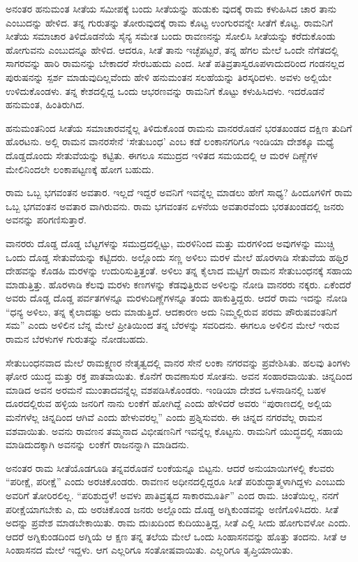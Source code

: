 ಅನಂತರ ಹನುಮಂತ ಸೀತೆಯ ಸಮೀಪಕ್ಕೆ ಬಂದು ಸೀತೆಯನ್ನು ಹುಡುಕು ವುದಕ್ಕೆ ರಾಮ ಕಳುಹಿಸಿದ ಚಾರ ತಾನು ಎಂಬುದನ್ನು ಹೇಳಿದ. ತನ್ನ ಗುರುತನ್ನು ತೋರುವುದಕ್ಕೆ ರಾಮ ಕೊಟ್ಟ ಉಂಗುರವನ್ನೇ ಸೀತೆಗೆ ಕೊಟ್ಟ. ರಾಮನಿಗೆ ಸೀತೆಯ ಸಮಾಚಾರ ತಿಳಿದೊಡನೆಯೆ ಸೈನ್ಯ ಸಮೇತ ಬಂದು ರಾವಣನನ್ನು ಸೋಲಿಸಿ ಸೀತೆಯನ್ನು ಕರೆದುಕೊಂಡು ಹೋಗುವನು ಎಂಬುದನ್ನೂ ಹೇಳಿದ. ಆದರೂ, ಸೀತೆ ತಾನು ಇಚ್ಛೆಪಟ್ಟರೆ, ತನ್ನ ಹೆಗಲ ಮೇಲೆ ಒಂದೇ ನೆಗೆತದಲ್ಲಿ ಸಾಗರವನ್ನು ಹಾರಿ ರಾಮನನ್ನು ಬೇಕಾದರೆ ಸೇರಬಹುದು ಎಂದ. ಸೀತೆ ಪತಿವ್ರತಾಸ್ವರೂಪಳಾದುದರಿಂದ ಗಂಡನಲ್ಲದ ಪುರುಷನನ್ನು ಸ್ಪರ್ಶ ಮಾಡುವುದಿಲ್ಲವೆಂದು ಹೇಳಿ ಹನುಮಂತನ ಸಲಹೆಯನ್ನು ತಿರಸ್ಕರಿದಳು. ಅವಳು ಅಲ್ಲಿಯೇ ಉಳಿದುಕೊಂಡಳು. ತನ್ನ ಕೇಶದಲ್ಲಿದ್ದ ಒಂದು ಆಭರಣವನ್ನು ರಾಮನಿಗೆ ಕೊಟ್ಟು ಕಳುಹಿಸಿದಳು. ಇದರೊಡನೆ ಹನುಮಂತ, ಹಿಂತಿರುಗಿದ.

ಹನುಮಂತನಿಂದ ಸೀತೆಯ ಸಮಾಚಾರವನ್ನೆಲ್ಲ ತಿಳಿದುಕೊಂಡ ರಾಮನು ವಾನರರೊಡನೆ ಭರತಖಂಡದ ದಕ್ಷಿಣ ತುದಿಗೆ ಹೊರಟನು. ಅಲ್ಲಿ ರಾಮನ ವಾನರಸೇನೆ ‘ಸೇತುಬಂಧ’ ಎಂಬ ಕಡೆ ಲಂಕಾನಗರಿಗೂ ಇಂಡಿಯಾ ದೇಶಕ್ಕೂ ಮಧ್ಯೆ ದೊಡ್ಡದೊಂದು ಸೇತುವೆಯನ್ನು ಕಟ್ಟಿತು. ಈಗಲೂ ಸಮುದ್ರದ ಇಳಿತದ ಸಮಯದಲ್ಲಿ ಆ ಮರಳ ದಿಣ್ಣೆಗಳ ಮೇಲಿನಿಂದಲೇ ಲಂಕಾಪಟ್ಟಣಕ್ಕೆ ಹೋಗ ಬಹುದು.

ರಾಮ ಒಬ್ಬ ಭಗವಂತನ ಅವತಾರ. ಇಲ್ಲದೆ ಇದ್ದರೆ ಅವನಿಗೆ ಇವನ್ನೆಲ್ಲ ಮಾಡಲು ಹೇಗೆ ಸಾಧ್ಯ? ಹಿಂದೂಗಳಿಗೆ ರಾಮ ಒಬ್ಬ ಭಗವಂತನ ಅವತಾರ ವಾಗಿರುವನು. ರಾಮ ಭಗವಂತನ ಏಳನೆಯ ಅವತಾರವೆಂದು ಭರತಖಂಡದಲ್ಲಿ ಜನರು ಅವನನ್ನು ಪರಿಗಣಿಸುತ್ತಾರೆ.

ವಾನರರು ದೊಡ್ಡ ದೊಡ್ಡ ಬೆಟ್ಟಗಳನ್ನು ಸಮುದ್ರದಲ್ಲಿಟ್ಟು, ಮರಳಿನಿಂದ ಮತ್ತು ಮರಗಳಿಂದ ಅವುಗಳನ್ನು ಮುಚ್ಚಿ ಒಂದು ದೊಡ್ಡ ಸೇತುವೆಯನ್ನು ಕಟ್ಟಿದರು. ಅಲ್ಲೊಂದು ಸಣ್ಣ ಅಳಿಲು ಮರಳ ಮೇಲೆ ಹೊರಳಾಡಿ ಸೇತುವೆಯ ಹಥ್ತಿರ ದೇಹವನ್ನು ಕೊಡಹಿ ಮರಳನ್ನು ಉದುರಿಸುತ್ತಿತ್ತಂತೆ. ಅಳಿಲು ತನ್ನ ಕೈಲಾದ ಮಟ್ಟಿಗೆ ರಾಮನ ಸೇತುಬಂಧನಕ್ಕೆ ಸಹಾಯ ಮಾಡುತ್ತಿತ್ತು. ಹೊರಳಾಡಿ ಕೆಲವು ಮರಳು ಕಣಗಳನ್ನು ಕೆಡವುತ್ತಿರುವ ಅಳಿಲನ್ನು ನೋಡಿ ವಾನರರು ನಕ್ಕರು. ಏಕೆಂದರೆ ಅವರು ದೊಡ್ಡ ದೊಡ್ಡ ಪರ್ವತಗಳನ್ನೂ ಮರಳುದಿಣ್ಣೆಗಳನ್ನೂ ತಂದು ಹಾಕುತ್ತಿದ್ದರು. ಆದರೆ ರಾಮ ಇದನ್ನು ನೋಡಿ “ಧನ್ಯ ಅಳಿಲು, ತನ್ನ ಕೈಲಾದಷ್ಟು ಅದು ಮಾಡುತ್ತಿದೆ. ಆದಕಾರಣ ಅದು ನಿಮ್ಮಲ್ಲಿರುವ ಪರಮ ಪೌರುಷವಂತನಿಗೆ ಸಮ” ಎಂದು ಅಳಿಲಿನ ಬೆನ್ನ ಮೇಲೆ ಪ್ರೀತಿಯಿಂದ ತನ್ನ ಬೆರಳನ್ನು ಸವರಿದನು. ಈಗಲೂ ಅಳಿಲಿನ ಮೇಲೆ ಇರುವ ರಾಮನ ಬೆರಳುಗಳ ಗುರುತನ್ನು ನೋಡಬಹದು.

ಸೇತುಬಂಧನವಾದ ಮೇಲೆ ರಾಮಕ್ಷ್ಮಣರ ನೇತೃತ್ವದಲ್ಲಿ ವಾನರ ಸೇನೆ ಲಂಕಾ ನಗರವನ್ನು ಪ್ರವೇಶಿಸಿತು. ಹಲವು ತಿಂಗಳು ಘೋರ ಯುದ್ಧ ಮತ್ತು ರಕ್ತ ಪಾತವಾಯಿತು. ಕೊನೆಗೆ ರಾವಣಾಸುರ ಸೋತನು. ಅವನ ಸಂಹಾರವಾಯಿತು. ಚಿನ್ನದಿಂದ ಮಾಡಿದ ಅವನ ಅರಮನೆ ಮುಂತಾದವನ್ನೆಲ್ಲ ವಶಪಡಿಸಿಕೊಂಡರು. ಇಂಡಿಯಾ ದೇಶದ ಒಳನಾಡಿನಲ್ಲಿ ಬಹಳ ದೂರದಲ್ಲಿರುವ ಹಳ್ಳಿಯ ಜನರಿಗೆ ನಾನು ಲಂಕೆಗೆ ಹೋಗಿದ್ದೆ ಎಂದು ಹೇಳಿದರೆ ಅವರು “ಪುರಾಣದಲ್ಲಿ ಅಲ್ಲಿಯ ಮನೆಗಳೆಲ್ಲ ಚಿನ್ನದಿಂದ ಆಗಿವೆ ಎಂದು ಹೇಳುವರಲ್ಲ” ಎಂದು ಪ್ರಶ್ನಿಸುವರು. ಈ ಚಿನ್ನದ ನಗರವೆಲ್ಲ ರಾಮನ ವಶವಾಯಿತು. ಅವನು ರಾವಣನ ತಮ್ಮನಾದ ವಿಭೀಷಣನಿಗೆ ಇವನ್ನೆಲ್ಲ ಕೊಟ್ಟನು. ರಾಮನಿಗೆ ಯುದ್ಧದಲ್ಲಿ ಸಹಾಯ ಮಾಡಿದುದಕ್ಕಾಗಿ ಅವನನ್ನು ಲಂಕೆಗೆ ರಾಜನನ್ನಾಗಿ ಮಾಡಿದನು.

ಅನಂತರ ರಾಮ ಸೀತೆಯೊಡಗೂಡಿ ತನ್ನವರೊಡನೆ ಲಂಕೆಯನ್ನೂ ಬಿಟ್ಟನು. ಆದರೆ ಅನುಯಾಯಿಗಳಲ್ಲಿ ಕೆಲವರು “ಪರೀಕ್ಷೆ, ಪರೀಕ್ಷೆ” ಎಂದು ಅರಚಿಕೊಂಡರು. ರಾವಣನ ಅಧೀನದಲ್ಲಿದ್ದರೂ ಸೀತೆ ಪರಿಶುದ್ಧಾತ್ಮಳಾಗಿದ್ದಳು ಎಂಬುದು ಅವರಿಗೆ ತೋರಿರಲಿಲ್ಲ. “ಪರಿಶುದ್ಧಳೆ! ಅವಳು ಪಾತಿವ್ರತ್ಯದ ಸಾಕಾರಮೂರ್ತಿ” ಎಂದ ರಾಮ. ಚಿಂತೆಯಿಲ್ಲ, ನನಗೆ ಪರೀಕ್ಷೆಯಾಗಬೇಕು ಎ, ದು ಅರಚಿಕೊಂಡ ಜನರು ಅಲ್ಲೊಂದು ದೊಡ್ಡ ಅಗ್ನಿಕುಂಡವನ್ನು ಅಣಿಗೊಳಿಸಿದರು. ಸೀತೆ ಅದನ್ನು ಪ್ರವೇಶ ಮಾಡಬೇಕಾಯಿತು. ರಾಮ ದುಃಖದಿಂದ ಕುದಿಯುತ್ತಿದ್ದ, ಸೀತೆ ಎಲ್ಲಿ ಸೀದು ಹೋಗುವಳೋ ಎಂದು. ಆದರೆ ಅಗ್ನಿಕುಂಡದಿಂದ ಅಗ್ನಿಯೆ ಆ ಕ್ಷಣ ತನ್ನ ತಲೆಯ ಮೇಲೆ ಒಂದು ಸಿಂಹಾಸನವನ್ನು ಹೊತ್ತು ತಂದನು. ಸೀತೆ ಆ ಸಿಂಹಾಸನದ ಮೇಲೆ ಇದ್ದಳು. ಆಗ ಎಲ್ಲರಿಗೂ ಸಂತೋಷವಾಯಿತು. ಎಲ್ಲರಿಗೂ ತೃಪ್ತಿಯಾಯಿತು.

